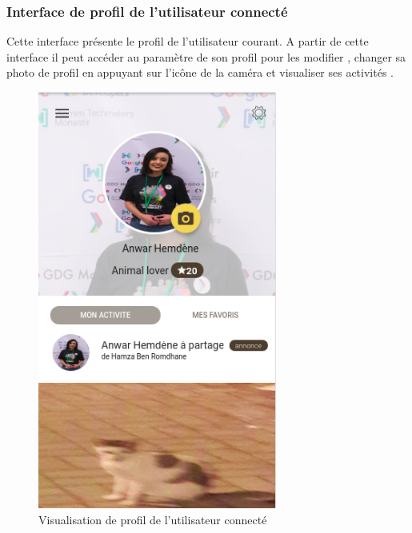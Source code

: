 \documentclass[11pt,a4paper,oneside]{book}
\begin{document}
					\subsubsection{Interface de profil de l'utilisateur connecté}
					Cette interface présente le profil de l’utilisateur courant. A partir de cette interface il peut accéder au paramètre de son profil pour les modifier , changer sa photo de profil en appuyant sur l'icône de  la caméra et visualiser ses activités .
					\begin{figure}[H]
						\centering
						\includegraphics[width=0.7\textwidth]{Images/ch4/profil}
						\caption{Visualisation de profil de l'utilisateur connecté}
						\label{fig:04-my-profil-my-activity}
					\end{figure}
			\vfill
			
\end{document}
